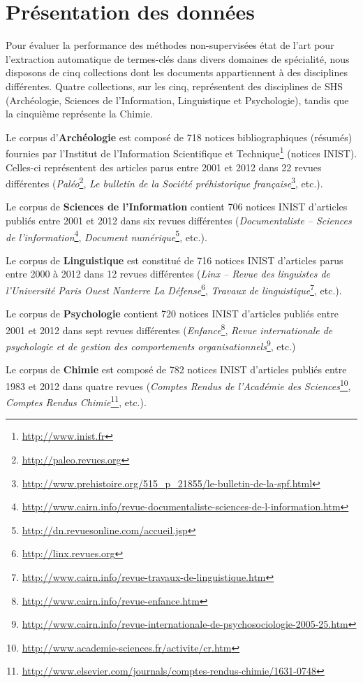 \section{Présentation des données}
\label{sec:presentation_des_donnees}
  Pour évaluer la performance des méthodes non-supervisées état de l'art pour
  l'extraction automatique de termes-clés dans divers domaines de spécialité,
  nous disposons de cinq collections dont les documents appartiennent à des
  disciplines différentes. Quatre collections, sur les cinq, représentent des
  disciplines de SHS (Archéologie, Sciences de l'Information, Linguistique et
  Psychologie), tandis que la cinquième représente la Chimie.

  Le corpus d'\textbf{Archéologie} est composé de 718 notices bibliographiques
  (résumés) fournies par l'Institut de l’Information Scientifique et
  Technique\footnote{\url{http://www.inist.fr}} (notices INIST). Celles-ci
  représentent des articles parus entre 2001 et 2012 dans 22 revues différentes
  (\textit{Paléo}\footnote{\url{http://paleo.revues.org}}, \textit{Le bulletin
  de la Société préhistorique
  française}\footnote{\url{http://www.prehistoire.org/515_p_21855/le-bulletin-de-la-spf.html}}, etc.).

  Le corpus de \textbf{Sciences de l'Information} contient 706 notices INIST
  d'articles publiés entre 2001 et 2012 dans six revues différentes
  (\textit{Documentaliste -- Sciences de
  l'information}\footnote{\url{http://www.cairn.info/revue-documentaliste-sciences-de-l-information.htm}},
  \textit{Document
  numérique}\footnote{\url{http://dn.revuesonline.com/accueil.jsp}}, etc.).

  Le corpus de \textbf{Linguistique} est constitué de 716 notices INIST
  d'articles parus entre 2000 à 2012 dans 12 revues différentes
  (\textit{Linx -- Revue des linguistes de l'Université Paris Ouest Nanterre La
  Défense}\footnote{\url{http://linx.revues.org}}, \textit{Travaux de
  linguistique}\footnote{\url{http://www.cairn.info/revue-travaux-de-linguistique.htm}}, etc.).

  Le corpus de \textbf{Psychologie} contient 720 notices INIST d'articles
  publiés entre 2001 et 2012 dans sept revues différentes
  (\textit{Enfance}\footnote{\url{http://www.cairn.info/revue-enfance.htm}},
  \textit{Revue internationale de psychologie et de gestion des comportements
  organisationnels}\footnote{\url{http://www.cairn.info/revue-internationale-de-psychosociologie-2005-25.htm}}, etc.)

  Le corpus de \textbf{Chimie} est composé de 782 notices INIST d'articles
  publiés entre 1983 et 2012 dans quatre revues (\textit{Comptes Rendus de
  l'Académie des
  Sciences}\footnote{\url{http://www.academie-sciences.fr/activite/cr.htm}},
  \textit{Comptes Rendus
  Chimie}\footnote{\url{http://www.elsevier.com/journals/comptes-rendus-chimie/1631-0748}}, etc.).

